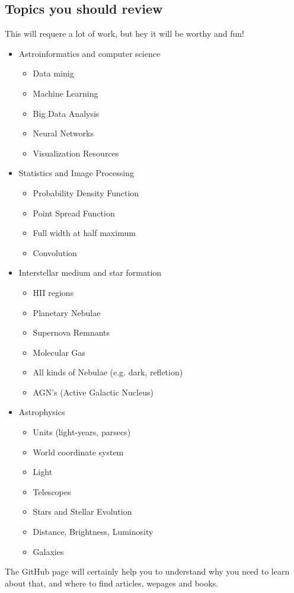 \documentclass[11pt,fleqn]{book} %
\begin{document}
\subsection{Topics you should review}
This will requere a lot of work, but hey it will be worthy and fun!
\begin{itemize}
	\item Astroinformatics and computer science
    	\begin{itemize}
        	\item Data minig
            \item Machine Learning
            \item Big Data Analysis
            \item Neural Networks
            \item Visualization Resources
        \end{itemize}
    \item Statistics and Image Processing
    	\begin{itemize}
        	\item Probability Density Function
            \item Point Spread Function
            \item Full width at half maximum
            \item Convolution
        \end{itemize}
    \item Interstellar medium and star formation
    	\begin{itemize}
        	\item HII regions
            \item Planetary Nebulae
            \item Supernova Remnants
            \item Molecular Gas
            \item All kinds of Nebulae (e.g. dark, refletion)
            \item AGN's (Active Galactic Nucleus)
        \end{itemize}
    \item Astrophysics
    	\begin{itemize}
        	\item Units (light-years, parsecs)
            \item World coordinate system
        	\item Light
            \item Telescopes
            \item Stars and Stellar Evolution
            \item Distance, Brightness, Luminosity
            \item Galaxies
        \end{itemize}
\end{itemize}
The GitHub page will certainly help you to understand why you need to learn about that, and where to find articles, wepages and books.
\end{document}
